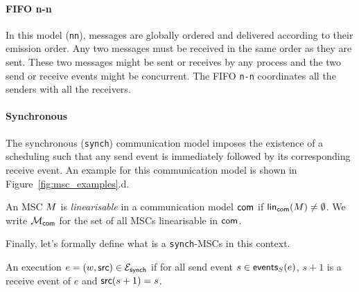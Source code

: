 \paragraph{FIFO n-n}
In this model (\verb|nn|), messages are globally ordered and delivered according to 
their emission order. Any two messages must be received in the same order 
as they are sent. These two messages might be sent or receives by any process 
and the two send or receive events might be concurrent. The FIFO \verb|n-n| 
coordinates all the senders with all the receivers.


\paragraph{Synchronous}
The synchronous (\verb|synch|) communication model imposes 
the existence of a scheduling such that any send event is 
immediately followed by its corresponding receive event. 
An example for this communication model is shown in Figure~\ref{fig:msc_examples}.d.

	
\begin{definition}\label{def:linearisable-msc}
	An MSC $M$ is \textit{linearisable} in a communication model $\mathsf{com}$
	if $\mathsf{lin}_{\mathsf{com}}(M)\neq\emptyset$.
	We write $\mathcal{M}_{\mathsf{com}}$ for the set of all MSCs 
	linearisable in $\mathsf{com}$.
\end{definition}

Finally, let's formally define what is a \verb|synch|-MSCs in this context.

\begin{definition}\label{def:synch}
	An execution $e=(w,\mathsf{src}) \in \mathcal{E}_{\mathsf{synch}}$
	if for all send event $s\in\mathsf{events}_S(e)$, $s+1$ is a receive event
	of $e$ and $\mathsf{src}(s+1)=s$.
\end{definition}

